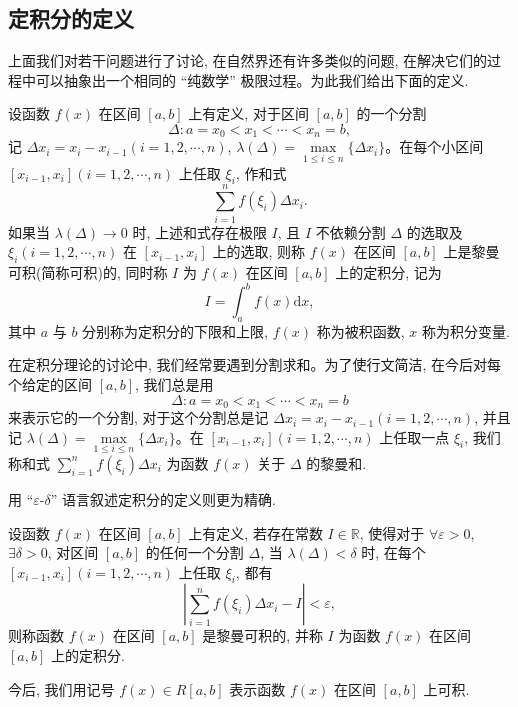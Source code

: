\subsection{定积分的定义}
\label{subsec:ma-7-1-2}

上面我们对若干问题进行了讨论, 在自然界还有许多类似的问题, 在解决它们的过程中可以抽象出一个相同的 ``纯数学'' 极限过程。为此我们给出下面的定义.

\begin{definition}\label{definition:ma-7-1-1}
设函数 $f(x)$ 在区间 $[a,b]$ 上有定义, 对于区间 $[a,b]$ 的一个分割
\[
  \Delta:a=x_0<x_1<\cdots<x_n=b,
\]
记 $\Delta x_i=x_i-x_{i-1}(i=1,2,\cdots,n)$, $\lambda(\Delta)=\max\limits_{1\leq i\leq n}\{\Delta x_i\}$。在每个小区间 $[x_{i-1},x_i](i=1,2,\cdots,n)$ 上任取 $\xi_i$, 作和式
\[
  \sum_{i=1}^n f(\xi_i)\Delta x_i.
\]
如果当 $\lambda(\Delta)\to0$ 时, 上述和式存在极限 $I$, 且 $I$ 不依赖分割 $\Delta$ 的选取及 $\xi_i(i=1,2,\cdots,n)$ 在 $[x_{i-1},x_i]$ 上的选取, 则称 $f(x)$ 在区间 $[a,b]$ 上是黎曼可积(简称可积)的, 同时称 $I$ 为 $f(x)$ 在区间 $[a,b]$ 上的定积分, 记为
\[
  I=\int_a^b f(x)\mathrm dx,
\]
其中 $a$ 与 $b$ 分别称为定积分的下限和上限, $f(x)$ 称为被积函数, $x$ 称为积分变量.
\end{definition}

在定积分理论的讨论中, 我们经常要遇到分割求和。为了使行文简洁, 在今后对每个给定的区间 $[a,b]$, 我们总是用
\[
  \Delta:a=x_0<x_1<\cdots<x_n=b
\]
来表示它的一个分割, 对于这个分割总是记 $\Delta x_i=x_i-x_{i-1}(i=1,2,\cdots,n)$, 并且记 $\lambda(\Delta)=\max\limits_{1\leq i\leq n}\{\Delta x_i\}$。在 $[x_{i-1},x_i](i=1,2,\cdots,n)$ 上任取一点 $\xi_i$, 我们称和式 $\sum\limits_{i=1}^n f(\xi_i)\Delta x_i$ 为函数 $f(x)$ 关于 $\Delta$ 的黎曼和.

用 ``$\varepsilon$-$\delta$'' 语言叙述定积分的定义则更为精确.

\begin{definition}\label{definition:ma-7-1-1-prime}
设函数 $f(x)$ 在区间 $[a,b]$ 上有定义, 若存在常数 $I\in\mathbb R$, 使得对于 $\forall\varepsilon>0$, $\exists\delta>0$, 对区间 $[a,b]$ 的任何一个分割 $\Delta$, 当 $\lambda(\Delta)<\delta$ 时, 在每个 $[x_{i-1},x_i](i=1,2,\cdots,n)$ 上任取 $\xi_i$, 都有
\[
  \left|\sum_{i=1}^n f(\xi_i)\Delta x_i-I\right|<\varepsilon,
\]
则称函数 $f(x)$ 在区间 $[a,b]$ 是黎曼可积的, 并称 $I$ 为函数 $f(x)$ 在区间 $[a,b]$ 上的定积分.
\end{definition}

今后, 我们用记号 $f(x)\in R[a,b]$ 表示函数 $f(x)$ 在区间 $[a,b]$ 上可积.

